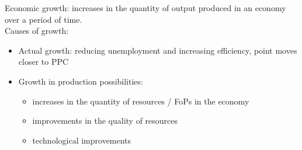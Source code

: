 \documentclass[a4paper,12pt]{article}
\begin{document}
Economic growth: increases in the quantity of output produced in an economy over a period of time.\\
Causes of growth: 
\begin{itemize}
  \item Actual growth: reducing unemployment and increasing efficiency, point moves closer to PPC
  \item Growth in production possibilities:
  \begin{itemize}
    \item increases in the quantity of resources / FoPs in the economy
    \item improvements in the quality of resources
    \item technological improvements
  \end{itemize}
\end{itemize}
\end{document}
